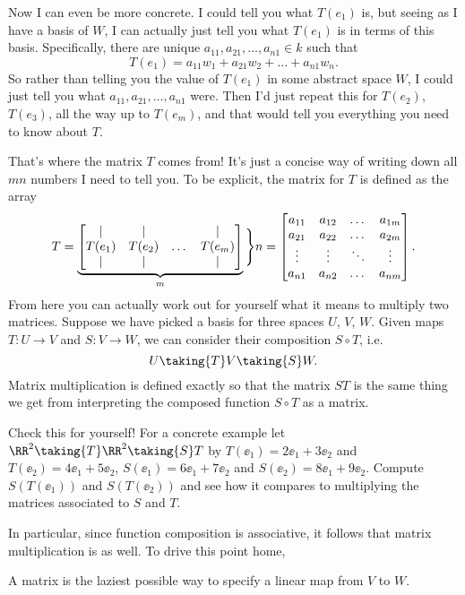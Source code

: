 Now I can even be more concrete.
I could tell you what $T(e_1)$ is, but seeing as I have a basis of $W$,
I can actually just tell you what $T(e_1)$ is in terms of this basis.
Specifically, there are unique $a_{11}, a_{21}, \dots, a_{n1} \in k$ such that
\[ T(e_1) = a_{11} w_1 + a_{21} w_2 + \dots + a_{n1} w_n. \]
So rather than telling you the value of $T(e_1)$ in some abstract space $W$,
I could just tell you what $a_{11}, a_{21}, \dots, a_{n1}$ were.
Then I'd just repeat this for $T(e_2)$, $T(e_3)$, all the way up to $T(e_m)$,
and that would tell you everything you need to know about $T$.

That's where the matrix $T$ comes from!
It's just a concise way of writing down all $mn$ numbers I need to tell you.
To be explicit, the matrix for $T$ is defined as the array
\[ T =  \underbrace{%
	\begin{bmatrix}
		\mid & \mid & & \mid \\	
		T(e_1) & T(e_2) & \dots & T(e_{m}) \\
		\mid & \mid & & \mid \\	
	\end{bmatrix}
	}_m \Bigg\} n
	=
	\begin{bmatrix}
		a_{11} & a_{12} & \dots & a_{1m} \\
		a_{21} & a_{22} & \dots & a_{2m} \\
		\vdots & \vdots & \ddots & \vdots \\
		a_{n1} & a_{n2} & \dots & a_{nm}
	\end{bmatrix}.
	\]
From here you can actually work out for yourself what it means to multiply two matrices.
Suppose we have picked a basis for three spaces $U$, $V$, $W$.
Given maps $T : U \to V$ and $S : V \to W$, we can consider their composition $S \circ T$, i.e.
\[ U \taking{T} V \taking{S} W. \]
Matrix multiplication is defined exactly so that the matrix $ST$
is the same thing we get from interpreting the composed function $S \circ T$ as a matrix.
\begin{exercise}
	Check this for yourself!
	For a concrete example let $\RR^2 \taking{T} \RR^2 \taking{S} T$
	by $T(\ee_1) = 2\ee_1+3\ee_2$ and $T(\ee_2) = 4\ee_1+5\ee_2$,
	$S(\ee_1) = 6\ee_1+7\ee_2$ and $S(\ee_2) = 8\ee_1+9\ee_2$.
	Compute $S(T(\ee_1))$ and $S(T(\ee_2))$ and see how it compares
	to multiplying the matrices associated to $S$ and $T$.
\end{exercise}
In particular, since function composition is associative,
it follows that matrix multiplication is as well.
To drive this point home,
\begin{moral}
	A matrix is the laziest possible way to specify
	a linear map from $V$ to $W$.
\end{moral}

